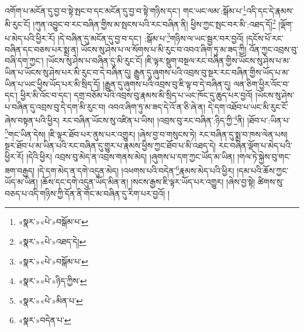 འགོག་པ་མངོན་དུ་བྱ་བ་སྟེ་སྤང་བ་དང་མངོན་དུ་བྱ་བ་སྟེ་གཉིས་དང་། གང་ཡང་ལམ་:སྒོམ་པ་\footnote{«སྣར་»«པེ་»བསྒོམ་པ་}འདི་དང་དེ་རྣམས་མི་རུང་ངོ། །ཀུན་འབྱུང་བ་རང་བཞིན་གྱིས་མ་སྤངས་པའི་རང་བཞིན་ནི། ཕྱིས་ཀྱང་སྤང་བར་མི་:འཐད་དོ།\footnote{«སྣར་»«པེ་»འཐད་དེ།} །ལྡོག་པ་མེད་པའི་ཕྱིར་རོ། །དེ་བཞིན་དུ་མངོན་དུ་བྱ་བ་དང་། :སྒོམ་པ་\footnote{«སྣར་»«པེ་»བསྒོམ་པ་}གཉིས་ལ་ཡང་སྦྱར་བར་བྱའོ། །དངོས་པོ་རང་བཞིན་དང་བཅས་པར་སྨྲ་ན། ཡོངས་སུ་ཤེས་པ་ལ་སོགས་པ་མི་རུང་བ་འབའ་ཞིག་ཏུ་མ་ཟད་ཀྱི། འོན་ཀྱང་འབྲས་བུ་བཞི་དག་ཀྱང་། །ཡོངས་སུ་ཤེས་པ་བཞིན་དུ་མི་རུང་ངོ། །ཇི་ལྟར་སྡུག་བསྔལ་རང་བཞིན་གྱིས་ཡོངས་སུ་ཤེས་པ་མ་ཡིན་པ་ཡོངས་སུ་ཤེས་པར་མི་རུང་བ་དེ་བཞིན་དུ། རྒྱུན་དུ་ཞུགས་པའི་འབྲས་བུ་སྔར་རང་བཞིན་གྱིས་ཡོད་པ་མ་ཡིན་པ་ཡང་ཕྱིས་ཡོད་པར་མི་སྲིད་དོ། །རྒྱུན་དུ་ཞུགས་པའི་འབྲས་བུ་ཇི་ལྟ་བ་དེ་བཞིན་དུ། ལན་ཅིག་ཕྱིར་འོང་བ་དང་། ཕྱིར་མི་འོང་བ་དང་། དགྲ་བཅོམ་པའི་འབྲས་བུ་རྣམས་མི་སྲིད་པ་ཡང་ཁོང་དུ་ཆུད་པར་བྱའོ། །ཡོངས་སུ་ཤེས་པ་བཞིན་དུ་འབྲས་བུ་དེ་དག་མི་རུང་བ། འབའ་ཞིག་ཏུ་མ་ཟད་དེ་འོ་ན་ཅི་ཞེ་ན། དེ་དག་འཐོབ་པ་ཡང་མི་རུང་ངོ་ཞེས་བསྟན་པའི་ཕྱིར། རང་བཞིན་ཡོངས་སུ་འཛིན་པ་ཡིས། །འབྲས་བུ་རང་བཞིན་:ཉིད་ཀྱི་\footnote{«སྣར་»«པེ་»ཉིད་ཀྱིས་}ནི། །ཐོབ་པ་:ཡིན་པ་\footnote{«སྣར་»«པེ་»མིན་པ་}གང་ཡིན་དེས། །ཇི་ལྟར་ཐོབ་པར་ནུས་པར་འགྱུར། །ཞེས་བྱ་བ་གསུངས་ཏེ། རང་བཞིན་དུ་སྨྲ་བ་ཁས་ལེན་པས། སྔར་ཐོབ་པ་མ་ཡིན་པའི་རང་བཞིན་དུ་གྱུར་པ་རྣམས་ཕྱིས་ཀྱང་ཐོབ་པ་མི་འཐད་དེ། རང་བཞིན་ལྡོག་པ་མེད་པའི་ཕྱིར་རོ། །དེའི་ཕྱིར། འབྲས་བུ་མེད་ན་འབྲས་གནས་མེད། །ཞུགས་པ་དག་ཀྱང་ཡོད་མ་ཡིན། །གལ་ཏེ་སྐྱེས་བུ་གང་ཟག་བརྒྱད། །དེ་དག་མེད་ན་དགེ་འདུན་མེད། །འཕགས་པའི་བདེན་\footnote{«སྣར་»བདེན་པ་}རྣམས་མེད་པའི་ཕྱིར། །དམ་པའི་ཆོས་ཀྱང་ཡོད་མ་ཡིན། །ཆོས་དང་དགེ་འདུན་ཡོད་མིན་ན། །སངས་རྒྱས་ཇི་ལྟར་ཡོད་པར་འགྱུར། །ཞེས་བྱ་སྟེ། ཚིགས་སུ་བཅད་པ་འདི་གཉིས་ཀྱི་དོན་ནི་གོང་མ་བཞིན་དུ་རིག་པར་བྱའོ། །
